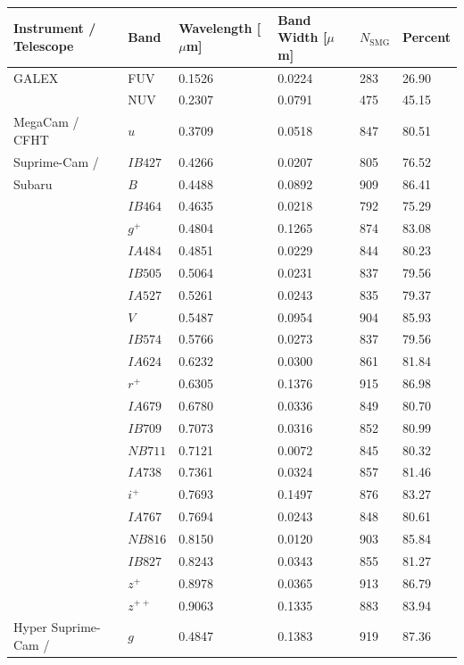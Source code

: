 \begin{table}
    \centering
    \begin{tabular}{p{4cm}|p{1.5cm}|p{2cm}|p{2cm}|p{1.5cm}|p{1.5cm}}
        \hline
		\hline
		Instrument / Telescope & Band & Wavelength [$\mu$m] & Band Width [$\mu$m] & $N_{\textrm{SMG}}$ & Percent \\
		\hline
		\hline
		GALEX & FUV & 0.1526 & 0.0224 & 283 & 26.90 \\
		& NUV & 0.2307 & 0.0791 & 475 & 45.15 \\
		\hline
		MegaCam / CFHT & $u$ & 0.3709 & 0.0518 & 847 & 80.51 \\
		\hline
		Suprime-Cam / & $IB427$ & 0.4266 & 0.0207 & 805 & 76.52 \\
		Subaru & $B$ & 0.4488 & 0.0892 & 909 & 86.41 \\
		& $IB464$ & 0.4635 & 0.0218 & 792 & 75.29 \\
		& $g^+$ & 0.4804 & 0.1265 & 874 & 83.08 \\
		& $IA484$ & 0.4851 & 0.0229 & 844 & 80.23 \\
		& $IB505$ & 0.5064 & 0.0231 & 837 & 79.56 \\
		& $IA527$ & 0.5261 & 0.0243 & 835 & 79.37 \\
		& $V$ & 0.5487 & 0.0954 & 904 & 85.93 \\
		& $IB574$ & 0.5766 & 0.0273 & 837 & 79.56 \\
		& $IA624$ & 0.6232 & 0.0300 & 861 & 81.84 \\
		& $r^+$ & 0.6305 & 0.1376 & 915 & 86.98 \\
		& $IA679$ & 0.6780 & 0.0336 & 849 & 80.70 \\
		& $IB709$ & 0.7073 & 0.0316 & 852 & 80.99 \\
		& $NB711$ & 0.7121 & 0.0072 & 845 & 80.32 \\
		& $IA738$ & 0.7361 & 0.0324 & 857 & 81.46 \\
		& $i^+$ & 0.7693 & 0.1497 & 876 & 83.27 \\
		& $IA767$ & 0.7694 & 0.0243 & 848 & 80.61 \\
		& $NB816$ & 0.8150 & 0.0120 & 903 & 85.84 \\
		& $IB827$ & 0.8243 & 0.0343 & 855 & 81.27 \\
		& $z^+$ & 0.8978 & 0.0365 & 913 & 86.79 \\
		& $z^{++}$ & 0.9063 & 0.1335 & 883 & 83.94 \\
        \hline
		Hyper Suprime-Cam / & $g$ & 0.4847 & 0.1383 & 919 & 87.36 \\

\end{tabular}
\end{table}

